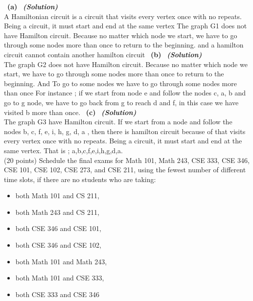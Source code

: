 \documentclass[a4 paper]{article}
\numberwithin{equation}{section}
\newcommand{\problem}[2]{~\\\fbox{\textbf{Problem #1}}\hfill (#2 points)\newline\newline}
\newcommand{\subproblem}[1]{~\newline\textbf{(#1)}}
\newcommand{\solution}{~\newline\textbf{\textit{(Solution)}} }
\newcommand{\0}{\mathbf{0}}
\begin{document}
\subproblem{a} \solution\\
\newline
A Hamiltonian circuit is a circuit that visits every vertex once with no repeats. Being a circuit, it must start and end at the same vertex
\newline
The graph G1 does not have Hamilton circuit. Because 
no matter which node we start, we have to go through some nodes more than once to return to the beginning.
\newline
and a hamilton circuit cannot contain another hamilton circuit
\newline
\subproblem{b} \solution\\
\newline
The graph G2 does not have Hamilton circuit. Because no matter which node we start, we have to go through some nodes more than once to return to the beginning. And To go to some nodes we have to go through some nodes more than once
\newline
For instance ;
\newline
if we start from node e and follow the nodes c, a, b and go to g node, we have to go back from g to reach d and f, in this case we have visited b more than once.
\newline
\subproblem{c} \solution\\
\newline
The graph G3 have Hamilton circuit.
\newline
If we start from a node and follow the nodes b, c, f, e, i, h, g, d, a , then there is hamilton circuit because of that visits every vertex once with no repeats. Being a circuit, it must start and end at the same vertex.
\newline
\newline
That is ; a,b,c,f,e,i,h,g,d,a.
\newline
\newpage
\problem{3: Applications on Graphs}{20}
Schedule the final exams for Math 101, Math 243, CSE 333, CSE 346, CSE 101, CSE 102, CSE 273, and CSE 211, using the fewest number of different time slots, if there are no students who are taking:
\begin{itemize}
	\item both Math 101 and CS 211,
	\item both Math 243 and CS 211,
	\item both CSE 346 and CSE 101,
	\item both CSE 346 and CSE 102,
	\item both Math 101 and Math 243,
	\item both Math 101 and CSE 333,
	\item both CSE 333 and CSE 346
\end{itemize}
\end{document}
